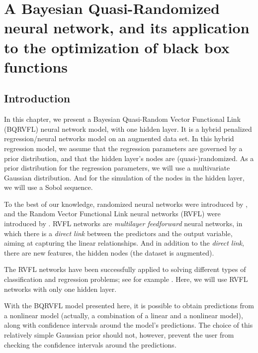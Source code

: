 %
\chapter{A Bayesian Quasi-Randomized neural network, and its application to the optimization of black box functions}
\label{sec:bayesian_rvfl}

\section{Introduction}
\label{intro}

In this chapter, we present a Bayesian Quasi-Random Vector Functional Link (BQRVFL) neural network model, with one hidden layer. It is a hybrid penalized regression/neural networks model on an augmented data set. In this hybrid regression model, we assume that the regression parameters are governed by a prior distribution, and that the hidden layer's nodes are (quasi-)randomized. As a prior distribution for the regression parameters, we will use a multivariate Gaussian distribution. And for the simulation of the nodes in the hidden layer, we will use a Sobol sequence. 

\medskip

To the best of our knowledge, randomized neural networks were introduced by \cite{schmidt1992feedforward}, and the Random Vector Functional Link neural networks (RVFL) were introduced by \cite{pao1994learning}. RVFL networks are \textit{multilayer feedforward} neural networks, in which there is a \textit{direct link} between the predictors and the output variable, aiming at capturing the linear relationships. And in addition to the \textit{direct link}, there are new features, the hidden nodes (the dataset is augmented).

\medskip

The RVFL networks have been successfully applied to solving different types of classification and regression problems; see for example \cite{dehuri2010comprehensive}. Here, we will use RVFL networks with only one hidden layer.

\medskip

With the BQRVFL model presented here, it is possible to obtain predictions from a nonlinear model (actually, a combination of a linear and a nonlinear model), along with confidence intervals around the model's predictions. The choice of this relatively simple Gaussian prior should not, however, prevent the user from checking the confidence intervals around the predictions. 

